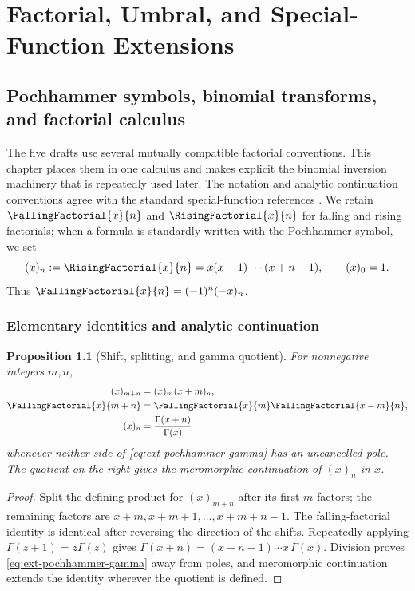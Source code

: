 \documentclass[11pt,a4paper,oneside,openany]{book}
\newtheorem{proposition}[theorem]{Proposition}
\theoremstyle{definition}
\theoremstyle{remark}
\begin{document}
\part{Factorial, Umbral, and Special-Function Extensions}

\chapter{Pochhammer symbols, binomial transforms, and factorial calculus}
\label{ch:ext-pochhammer}

The five drafts use several mutually compatible factorial conventions.  This
chapter places them in one calculus and makes explicit the binomial inversion
machinery that is repeatedly used later.  The notation and analytic continuation
conventions agree with the standard special-function references
\cite{NISTDLMF,WhittakerWatson1927}.  We retain
\(\FallingFactorial{x}{n}\) and \(\RisingFactorial{x}{n}\) for falling and rising factorials;
when a formula is standardly written with the Pochhammer symbol, we set
\begin{equation}\label{eq:ext-pochhammer-def}
 (x)_n:=\RisingFactorial{x}{n}=x(x+1)\cdots(x+n-1),\qquad (x)_0=1.
\end{equation}
Thus \(\FallingFactorial{x}{n}=(-1)^n(-x)_n\).

\section{Elementary identities and analytic continuation}

\begin{proposition}[Shift, splitting, and gamma quotient]
For nonnegative integers \(m,n\),
\begin{align}
 (x)_{m+n}&=(x)_m(x+m)_n,\label{eq:ext-pochhammer-split}\\
 \FallingFactorial{x}{m+n}&=\FallingFactorial{x}{m}\FallingFactorial{x-m}{n},\label{eq:ext-falling-split}\\
 (x)_n&=\frac{\Gamma(x+n)}{\Gamma(x)}\label{eq:ext-pochhammer-gamma}
\end{align}
whenever neither side of \eqref{eq:ext-pochhammer-gamma} has an uncancelled
pole.  The quotient on the right gives the meromorphic continuation of
\((x)_n\) in \(x\).
\end{proposition}
\begin{proof}
Split the defining product for \((x)_{m+n}\) after its first \(m\) factors;
the remaining factors are \(x+m,x+m+1,\ldots,x+m+n-1\).  The falling-factorial
identity is identical after reversing the direction of the shifts.  Repeatedly
applying \(\Gamma(z+1)=z\Gamma(z)\) gives
\(\Gamma(x+n)=(x+n-1)\cdots x\,\Gamma(x)\).  Division proves
\eqref{eq:ext-pochhammer-gamma} away from poles, and meromorphic continuation
extends the identity wherever the quotient is defined.
\end{proof}
\end{document}
